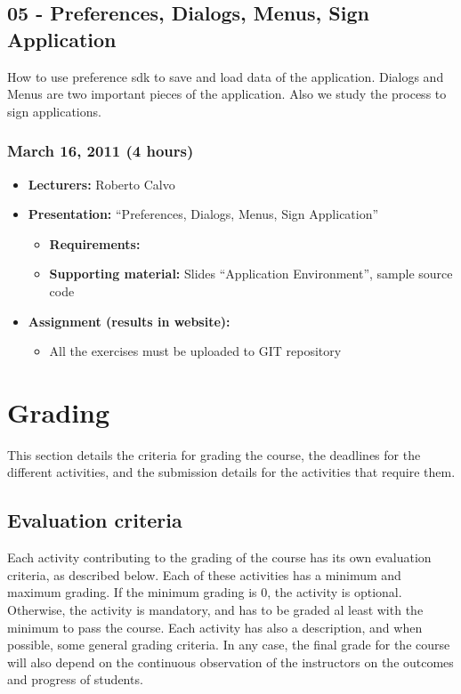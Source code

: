 \documentclass[a4paper]{article}
\begin{document}
\subsection{05 - Preferences, Dialogs, Menus, Sign Application}

How to use preference sdk to save and load data of the
application. Dialogs and Menus are two important pieces of the
application. Also we study the process to sign applications.

\subsubsection{March 16, 2011 (4 hours)}

\begin{itemize}
\item \textbf{Lecturers:} Roberto Calvo
\item \textbf{Presentation:} ``Preferences, Dialogs, Menus, Sign Application''
  \begin{itemize}
  \item \textbf{Requirements:} 
  \item \textbf{Supporting material:} Slides ``Application Environment'', sample source code 
  \end{itemize}
\item \textbf{Assignment (results in website):} 
  \begin{itemize}
  \item All the exercises must be uploaded to GIT repository
  \end{itemize}
\end{itemize}


\section{Grading}

This section details the criteria for grading the course, the
deadlines for the different activities, and the submission details for
the activities that require them.

\subsection{Evaluation criteria}
\label{sub:evaluation-criteria}

Each activity contributing to the grading of the course has its own
evaluation criteria, as described below. Each of these activities has
a minimum and maximum grading. If the minimum grading is 0, the
activity is optional. Otherwise, the activity is mandatory, and has to
be graded al least with the minimum to pass the course. Each activity
has also a description, and when possible, some general grading
criteria. In any case, the final grade for the course will also depend
on the continuous observation of the instructors on the outcomes and
progress of students.
\end{document}
